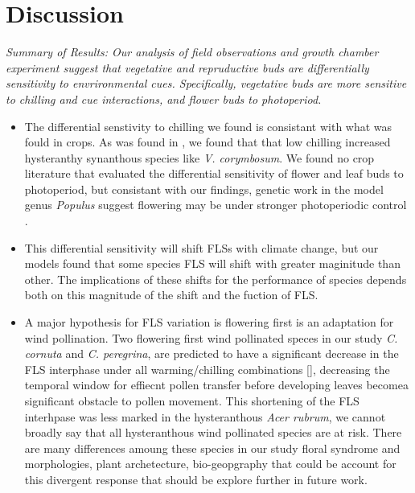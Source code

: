 \documentclass[11pt]{article}
\begin{document}
\section*{Discussion}
\textit{Summary of Results: Our analysis of field observations and growth chamber experiment suggest that vegetative and repruductive buds are differentially sensitivity to envrironmental cues. Specifically, vegetative buds are more sensitive to chilling and cue interactions, and flower buds to photoperiod. }
\begin{itemize}
\item The differential senstivity to chilling we found is consistant with what was fould in crops. As was found in \citet{Garigalio20106}, we found that that low chilling increased hysteranthy synanthous species like \textit{V. corymbosum}. We found no crop literature that evaluated the differential sensitivity of flower and leaf buds to photoperiod, but consistant with our findings, genetic work in the model genus \textit{Populus} suggest flowering may be under stronger photoperiodic control \citep{}.

\item This differential sensitivity will shift FLSs with climate change, but our models found that some species FLS will shift with greater maginitude than other. The implications of these shifts for the performance of species depends both on this magnitude of the shift and the fuction of FLS.

\item A major hypothesis for FLS variation is flowering first is an adaptation for wind pollination. Two flowering first wind pollinated speces in our study \textit{C. cornuta} and \textit{C. peregrina}, are predicted to have a significant decrease in the FLS interphase under all warming/chilling combinations \ref{}, decreasing the temporal window for effiecnt pollen transfer before developing leaves becomea significant obstacle to pollen movement. This shortening of the FLS interhpase was less marked in the hysteranthous \textit{Acer rubrum}, we cannot broadly say that all hysteranthous wind pollinated species are at risk. There are many differences amoung these species in our study floral syndrome and morphologies, plant archetecture, bio-geopgraphy that could be account for this divergent response that should be explore further in future work.


\end{itemize}
\end{document}
